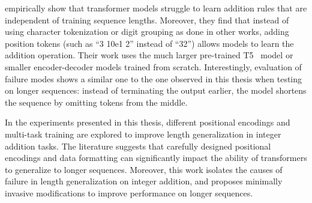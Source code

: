 \cite{nogueira_investigating_2021} empirically show that transformer models struggle to learn addition rules that are independent of training sequence lengths. Moreover, they find that instead of using character tokenization or digit grouping as done in other works, adding position tokens (such as ``3 10e1 2'' instead of ``32'') allows models to learn the addition operation. Their work uses the much larger pre-trained T5~\parencite{raffel_exploring_2020} model or smaller encoder-decoder models trained from scratch. Interestingly, evaluation of failure modes shows a similar one to the one observed in this thesis when testing on longer sequences: instead of terminating the output earlier, the model shortens the sequence by omitting tokens from the middle.

In the experiments presented in this thesis, different positional encodings and multi-task training are explored to improve length generalization in integer addition tasks. The literature suggests that carefully designed positional encodings and data formatting can significantly impact the ability of transformers to generalize to longer sequences. Moreover, this work isolates the causes of failure in length generalization on integer addition, and proposes minimally invasive modifications to improve performance on longer sequences.